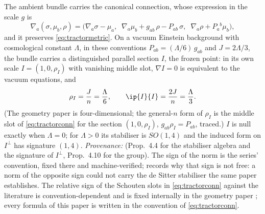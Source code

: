 The ambient bundle carries the canonical connection, whose expression in the scale $g$ is
\begin{equation}
\nabla_{a}(\sigma, \mu_{b}, \rho) = \bigl(\nabla_{a}\sigma - \mu_{a},\;\; \nabla_{a}\mu_{b} + g_{ab}\,\rho - P_{ab}\,\sigma,\;\; \nabla_{a}\rho + P_{a}{}^{b}\mu_{b}\bigr),
\end{equation}
and it preserves \eqref{eq:tractormetric}. On a vacuum Einstein background with cosmological constant $\Lambda$, in these conventions $P_{ab} = (\Lambda/6)\,g_{ab}$ and $J = 2\Lambda/3$, the bundle carries a distinguished parallel section $I$, the frozen point: in its own scale $I = (1, 0, \rho_{I})$ with vanishing middle slot, $\nabla I = 0$ is equivalent to the vacuum equations, and
\[
\rho_{I} = \frac{J}{n} = \frac{\Lambda}{6}, \qquad \ip{I}{I} = \frac{2J}{n} = \frac{\Lambda}{3}.
\]
(The geometry paper is four-dimensional; the general-$n$ form of $\rho_{I}$ is the middle slot of \eqref{eq:tractorconn} for the section $(1, 0, \rho_{I})$, $g_{ab}\rho_{I} = P_{ab}$, traced.) $I$ is null exactly when $\Lambda = 0$; for $\Lambda > 0$ its stabiliser is $SO(1,4)$ and the induced form on $I^{\perp}$ has signature $(1,4)$. \emph{Provenance:} \cite[Fact~4.1, Prop.~4.4, Thm.~4.5, Thm.~4.7, Prop.~4.10]{ButlerT6} (Prop.~4.4 for the stabiliser algebra and the signature of $I^{\perp}$, Prop.~4.10 for the group). The sign of the norm is the series' convention, fixed there and machine-verified; \cite[Rem.~4.9]{ButlerT6} records why that sign is not free: a norm of the opposite sign could not carry the de Sitter stabiliser the same paper establishes. The relative sign of the Schouten slots in \eqref{eq:tractorconn} against the literature is convention-dependent and is fixed internally in the geometry paper \cite[Lem.~4.8]{ButlerT6}; every formula of this paper is written in the convention of \eqref{eq:tractorconn}.
